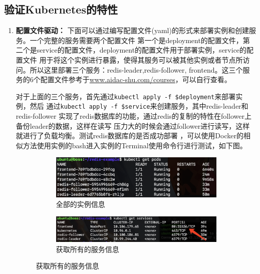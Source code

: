 \documentclass{article}
\begin{document}
\subsection{验证Kubernetes的特性}
\begin{enumerate}
    \item {\textbf{\heiti 配置文件驱动：}}
下面可以通过编写配置文件(yaml)的形式来部署实例和创建服务。一个完整的服务需要两个配置文件
第一个是deployment的配置文件，第二个是service的配置文件，deployment的配置文件用于部署实例，service的配置文件
用于将这个实例进行暴露，使得其服务可以被其他实例或者节点所访问。所以这里部署三个服务：redis-leader,redis-follower,
frontend。这三个服务的6个配置文件参考于\url{www.aidac-shu.com/courses}，可以自行查看。

\quad \quad 对于上面的三个服务，首先通过\texttt{kubectl apply -f \${deployment}}来部署实例，然后
通过\texttt{kubectl apply -f \${service}}来创建服务，其中redis-leader和redis-follower
实现了redis数据库的功能，通过redis的复制的特性在follower上备份leader的数据，这样在读写
压力大的时候会通过follower进行读写，这样就进行了负载均衡。测试redis数据库的是否成功部署
，可以使用Docker的相似方法使用实例的bash进入实例的Terminal使用命令行进行测试，如下图。

\begin{figure}[H]
    \centering
    \begin{subfigure}[b]{0.45\textwidth}
        \centering
        \includegraphics[width=\textwidth]{podsall.png}
        \caption{全部的实例信息}
        \label{fig:podsall}
    \end{subfigure}
    \hfill
    \begin{subfigure}[b]{0.50\textwidth}
        \centering
        \includegraphics[width=\textwidth]{service1.png}
        \caption{获取所有的服务信息}
        \label{fig:service1}
    \end{subfigure}


\end{figure}
\end{enumerate}
\end{document}
